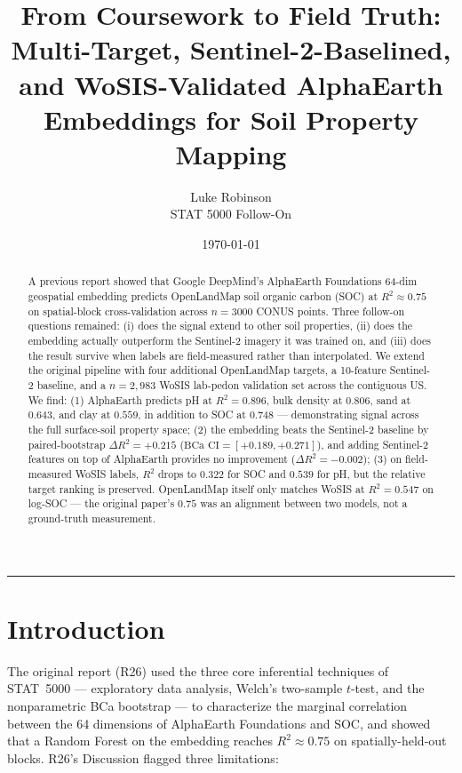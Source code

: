\documentclass[11pt]{article}
\title{\textbf{From Coursework to Field Truth: Multi-Target,
Sentinel-2-Baselined, and WoSIS-Validated AlphaEarth Embeddings for
Soil Property Mapping}}
\author{Luke Robinson \\ STAT 5000 Follow-On}
\date{\today}
\begin{document}
\maketitle
\hrule
\vspace{0.5em}

\begin{abstract}
\noindent A previous report \cite{robinson2026r26} showed that Google
DeepMind's AlphaEarth Foundations 64-dim geospatial embedding predicts
OpenLandMap soil organic carbon (SOC) at $R^2 \approx 0.75$ on
spatial-block cross-validation across $n = 3000$ CONUS points. Three
follow-on questions remained: (i) does the signal extend to other soil
properties, (ii) does the embedding actually outperform the Sentinel-2
imagery it was trained on, and (iii) does the result survive when labels
are field-measured rather than interpolated. We extend the original
pipeline with four additional OpenLandMap targets, a 10-feature
Sentinel-2 baseline, and a $n = 2{,}983$ WoSIS lab-pedon validation set
across the contiguous US. We find: (1) AlphaEarth predicts pH at
$R^2 = 0.896$, bulk density at $0.806$, sand at $0.643$, and clay at
$0.559$, in addition to SOC at $0.748$ --- demonstrating signal across
the full surface-soil property space; (2) the embedding beats the
Sentinel-2 baseline by paired-bootstrap $\Delta R^2 = +0.215$
($\text{BCa CI} = [+0.189, +0.271]$), and adding Sentinel-2 features on
top of AlphaEarth provides no improvement ($\Delta R^2 = -0.002$);
(3) on field-measured WoSIS labels, $R^2$ drops to $0.322$ for SOC and
$0.539$ for pH, but the relative target ranking is preserved.
OpenLandMap itself only matches WoSIS at $R^2 = 0.547$ on log-SOC ---
the original paper's $0.75$ was an alignment between two models, not a
ground-truth measurement.
\end{abstract}

\section{Introduction}

The original report \cite{robinson2026r26} (R26) used the three core
inferential techniques of STAT~5000 --- exploratory data analysis,
Welch's two-sample $t$-test, and the nonparametric BCa bootstrap --- to
characterize the marginal correlation between the 64 dimensions of
AlphaEarth Foundations \cite{brown2025alphaearth} and SOC, and showed
that a Random Forest \cite{breiman2001randomforests} on the embedding
reaches $R^2 \approx 0.75$ on spatially-held-out blocks. R26's
Discussion flagged three limitations:
\end{document}
